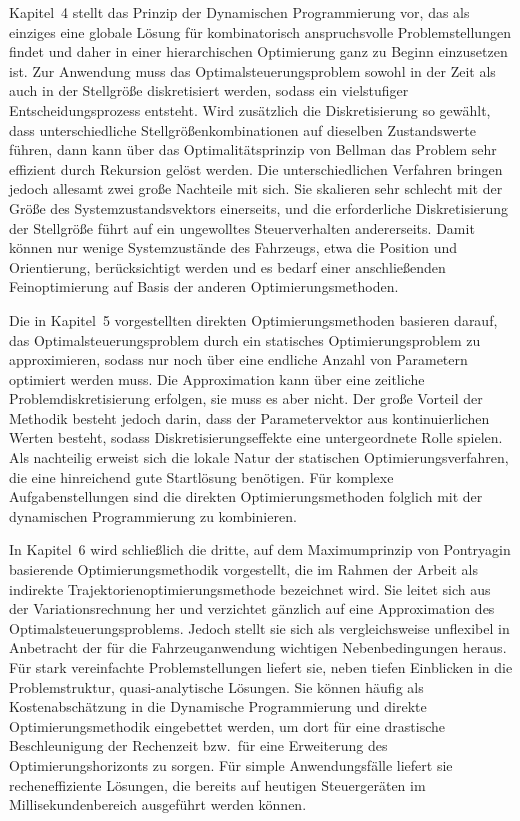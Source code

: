 Kapitel~4 stellt das Prinzip der Dynamischen Programmierung vor, das als einziges eine globale Lösung für kombinatorisch anspruchsvolle Problemstellungen findet und daher in einer hierarchischen Optimierung ganz zu Beginn einzusetzen ist. Zur Anwendung muss das Optimalsteuerungsproblem sowohl in der Zeit als auch in der Stellgröße diskretisiert werden, sodass ein vielstufiger Entscheidungsprozess entsteht. Wird zusätzlich die Diskretisierung so gewählt, dass unterschiedliche Stellgrößenkombinationen auf dieselben Zustandswerte führen, dann kann über das Optimalitätsprinzip von Bellman das Problem sehr effizient durch Rekursion gelöst werden. Die unterschiedlichen Verfahren bringen jedoch allesamt zwei große Nachteile mit sich. Sie skalieren sehr schlecht mit der Größe des Systemzustandsvektors einerseits, und die erforderliche Diskretisierung der Stellgröße führt auf ein ungewolltes Steuerverhalten andererseits. Damit können nur wenige Systemzustände des Fahrzeugs, etwa die Position und Orientierung, berücksichtigt werden und es bedarf einer anschließenden Feinoptimierung auf Basis der anderen  Optimierungsmethoden. 

Die in Kapitel~5 vorgestellten direkten Optimierungsmethoden basieren darauf, das Optimalsteuerungsproblem durch ein statisches Optimierungsproblem zu approximieren, sodass nur noch über eine endliche Anzahl von Parametern optimiert werden muss. Die Approximation kann über eine zeitliche Problemdiskretisierung erfolgen, sie muss es aber nicht. Der große Vorteil der Methodik besteht jedoch darin, dass der Parametervektor aus kontinuierlichen Werten besteht, sodass Diskretisierungseffekte eine untergeordnete Rolle spielen. Als nachteilig erweist sich die lokale Natur der statischen Optimierungsverfahren, die eine hinreichend gute Startlösung benötigen. Für komplexe Aufgabenstellungen sind die direkten Optimierungsmethoden folglich mit der dynamischen Programmierung zu kombinieren.

In Kapitel~6 wird schließlich die dritte, auf dem Maximumprinzip von Pontryagin basierende Optimierungsmethodik vorgestellt, die im Rahmen der Arbeit als indirekte Trajektorienoptimierungsmethode bezeichnet wird. Sie leitet sich aus der Variationsrechnung her und verzichtet gänzlich auf eine Approximation des Optimalsteuerungsproblems. Jedoch stellt sie sich als vergleichsweise unflexibel in Anbetracht der für die Fahrzeuganwendung wichtigen Nebenbedingungen heraus. Für stark vereinfachte Problemstellungen liefert sie, neben tiefen Einblicken in die Problemstruktur, quasi-analytische Lösungen. Sie können häufig als Kostenabschätzung in die Dynamische Programmierung und direkte Optimierungsmethodik eingebettet werden, um dort für eine drastische Beschleunigung der Rechenzeit bzw.\ für eine Erweiterung des Optimierungshorizonts zu sorgen. Für simple Anwendungsfälle liefert sie recheneffiziente Lösungen, die bereits auf heutigen Steuergeräten im Millisekundenbereich ausgeführt werden können.

